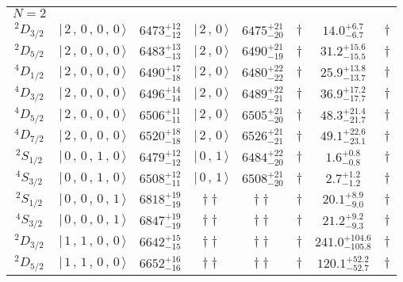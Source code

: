 \begin{tabular}{c| c c c c c c c}
\hline
 $N=2$  &  &  &  &  &  \\ 
$^{2}D_{3/2}$ & $\vert \,2\,,\,0\,,\,0\,,\,0 \,\rangle $ & $6473^{+12}_{-12}$ & $\vert \,2\,,\,0 \,\rangle$ & $6475^{+21}_{-20}$ & $\dagger$ & $14.0^{+6.7}_{-6.7}$ & $\dagger$ \\ 
$^{2}D_{5/2}$ & $\vert \,2\,,\,0\,,\,0\,,\,0 \,\rangle $ & $6483^{+13}_{-13}$ & $\vert \,2\,,\,0 \,\rangle$ & $6490^{+21}_{-19}$ & $\dagger$ & $31.2^{+15.6}_{-15.5}$ & $\dagger$ \\ 
$^{4}D_{1/2}$ & $\vert \,2\,,\,0\,,\,0\,,\,0 \,\rangle $ & $6490^{+17}_{-18}$ & $\vert \,2\,,\,0 \,\rangle$ & $6480^{+22}_{-22}$ & $\dagger$ & $25.9^{+13.8}_{-13.7}$ & $\dagger$ \\ 
$^{4}D_{3/2}$ & $\vert \,2\,,\,0\,,\,0\,,\,0 \,\rangle $ & $6496^{+14}_{-14}$ & $\vert \,2\,,\,0 \,\rangle$ & $6489^{+22}_{-21}$ & $\dagger$ & $36.9^{+17.2}_{-17.7}$ & $\dagger$ \\ 
$^{4}D_{5/2}$ & $\vert \,2\,,\,0\,,\,0\,,\,0 \,\rangle $ & $6506^{+11}_{-11}$ & $\vert \,2\,,\,0 \,\rangle$ & $6505^{+21}_{-20}$ & $\dagger$ & $48.3^{+21.4}_{-21.7}$ & $\dagger$ \\ 
$^{4}D_{7/2}$ & $\vert \,2\,,\,0\,,\,0\,,\,0 \,\rangle $ & $6520^{+18}_{-18}$ & $\vert \,2\,,\,0 \,\rangle$ & $6526^{+21}_{-21}$ & $\dagger$ & $49.1^{+22.6}_{-23.1}$ & $\dagger$ \\ 
$^{2}S_{1/2}$ & $\vert \,0\,,\,0\,,\,1\,,\,0 \,\rangle $ & $6479^{+12}_{-12}$ & $\vert \,0\,,\,1 \,\rangle$ & $6484^{+22}_{-20}$ & $\dagger$ & $1.6^{+0.8}_{-0.8}$ & $\dagger$ \\ 
$^{4}S_{3/2}$ & $\vert \,0\,,\,0\,,\,1\,,\,0 \,\rangle $ & $6508^{+12}_{-11}$ & $\vert \,0\,,\,1 \,\rangle$ & $6508^{+21}_{-20}$ & $\dagger$ & $2.7^{+1.2}_{-1.2}$ & $\dagger$ \\ 
$^{2}S_{1/2}$ & $\vert \,0\,,\,0\,,\,0\,,\,1 \,\rangle $ & $6818^{+19}_{-19}$ & $\dagger\dagger$ & $\dagger\dagger$ & $\dagger$ & $20.1^{+8.9}_{-9.0}$ & $\dagger$ \\ 
$^{4}S_{3/2}$ & $\vert \,0\,,\,0\,,\,0\,,\,1 \,\rangle $ & $6847^{+19}_{-19}$ & $\dagger\dagger$ & $\dagger\dagger$ & $\dagger$ & $21.2^{+9.2}_{-9.3}$ & $\dagger$ \\ 
$^{2}D_{3/2}$ & $\vert \,1\,,\,1\,,\,0\,,\,0 \,\rangle $ & $6642^{+15}_{-15}$ & $\dagger\dagger$ & $\dagger\dagger$ & $\dagger$ & $241.0^{+104.6}_{-105.8}$ & $\dagger$ \\ 
$^{2}D_{5/2}$ & $\vert \,1\,,\,1\,,\,0\,,\,0 \,\rangle $ & $6652^{+16}_{-16}$ & $\dagger\dagger$ & $\dagger\dagger$ & $\dagger$ & $120.1^{+52.2}_{-52.7}$ & $\dagger$ \\ 

\end{tabular}
